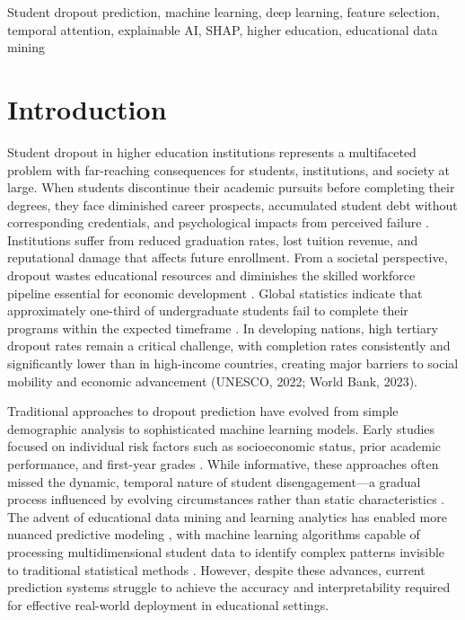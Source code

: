 \documentclass[journal]{IEEEtran}
\begin{document}
\begin{IEEEkeywords}
Student dropout prediction, machine learning, deep learning, feature selection, temporal attention, explainable AI, SHAP, higher education, educational data mining
\end{IEEEkeywords}

\section{Introduction}

Student dropout in higher education institutions represents a multifaceted problem with far-reaching consequences for students, institutions, and society at large. When students discontinue their academic pursuits before completing their degrees, they face diminished career prospects, accumulated student debt without corresponding credentials, and psychological impacts from perceived failure \cite{rahmani2024dropout,pelima2024predicting}. Institutions suffer from reduced graduation rates, lost tuition revenue, and reputational damage that affects future enrollment. From a societal perspective, dropout wastes educational resources and diminishes the skilled workforce pipeline essential for economic development \cite{kaplan1977dropout,wirba2022transforming}. Global statistics indicate that approximately one-third of undergraduate students fail to complete their programs within the expected timeframe \cite{fia2022higher}. In developing nations, high tertiary dropout rates remain a critical challenge, with completion rates consistently and significantly lower than in high-income countries, creating major barriers to social mobility and economic advancement (UNESCO, 2022; World Bank, 2023).

Traditional approaches to dropout prediction have evolved from simple demographic analysis to sophisticated machine learning models. Early studies focused on individual risk factors such as socioeconomic status, prior academic performance, and first-year grades \cite{wolniak2010academic, reynolds2020factors}. While informative, these approaches often missed the dynamic, temporal nature of student disengagement---a gradual process influenced by evolving circumstances rather than static characteristics \cite{lopez2024dynamics}. The advent of educational data mining and learning analytics has enabled more nuanced predictive modeling \cite{shafiq2022student,susnjak2024beyond}, with machine learning algorithms capable of processing multidimensional student data to identify complex patterns invisible to traditional statistical methods \cite{balachandar2025multi,nath2025smart}. However, despite these advances, current prediction systems struggle to achieve the accuracy and interpretability required for effective real-world deployment in educational settings.
\end{document}
